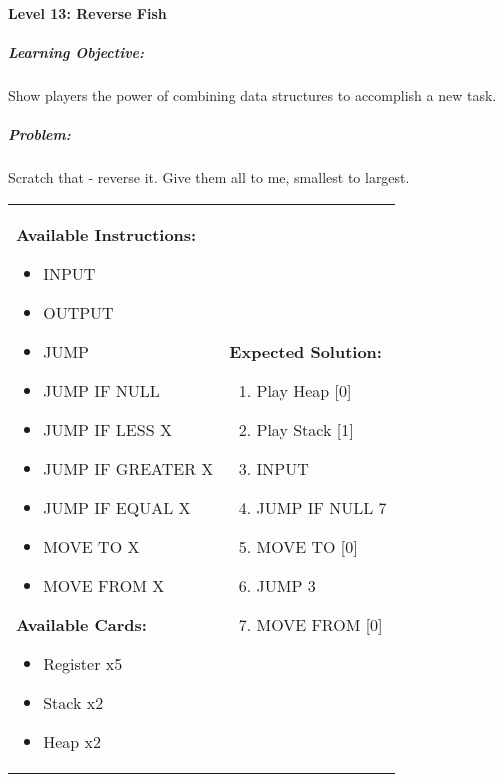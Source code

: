 \paragraph{Level 13: Reverse Fish}
\subparagraph{Learning Objective:} Show players the power of combining data structures to accomplish a new task.

\subparagraph{Problem:} Scratch that - reverse it. Give them all to me, smallest to largest.

\begin{center}
    \begin{tabular}{ | m{6cm} | m{8cm} | } 
        \hline
            \textbf{Available Instructions:} 
            \begin{itemize}
                \setlength\itemsep{-.35em}
                \item INPUT
                \item OUTPUT
                \item JUMP
                \item JUMP IF NULL
                \item JUMP IF LESS X
                \item JUMP IF GREATER X
		\item JUMP IF EQUAL X
                \item MOVE TO X
                \item MOVE FROM X
            \end{itemize}
            \textbf{Available Cards:} 
            \begin{itemize}
                \setlength\itemsep{-.35em}
                \item Register x5
                \item Stack x2
                \item Heap x2
            \end{itemize}& 
            \textbf{Expected Solution:} 
            \begin{enumerate}
                \setlength\itemsep{-.35em}
                \item Play Heap [0]
                \item Play Stack [1]
                \item INPUT
                \item JUMP IF NULL 7
                \item MOVE TO [0]
                \item JUMP 3
                \item MOVE FROM [0]

\end{enumerate}
\end{tabular}
\end{center}
